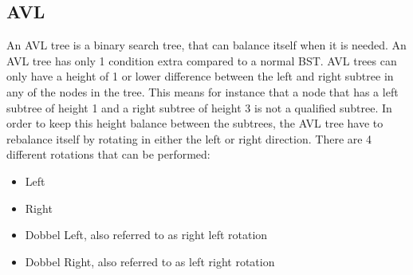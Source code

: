 \subsection{AVL}
An AVL tree is a binary search tree, that can balance itself when it is needed. An AVL tree has only 1 condition extra compared to a normal BST. AVL trees can only have a height of 1 or lower difference between the left and right subtree in any of the nodes in the tree. This means for instance that a node that has a left subtree of height 1 and a right subtree of height 3 is not a qualified subtree. In order to keep this height balance between the subtrees, the AVL tree have to rebalance itself by rotating in either the left or right direction. There are 4 different rotations that can be performed:
\begin{itemize}
	\item{Left}
	\item{Right}
	\item{Dobbel Left, also referred to as right left rotation}
	\item{Dobbel Right, also referred to as left right rotation}
\end{itemize}